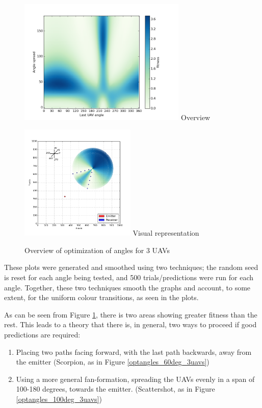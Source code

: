 \documentclass[10pt,a4paper]{book}
\begin{document}
\begin{figure}[H]
\centering
\begin{minipage}{70mm}
  \centering
  \includegraphics[width=80mm]{optangles/3uavs5stepsoverview.png}
  Overview
\end{minipage}%
\begin{minipage}{55mm}
  \centering
  \includegraphics[width=55mm]{optangles/3uavs5steps60deg_2.png}
  Visual representation
\end{minipage}
\caption{Overview of optimization of angles for  3 \glspl{UAV}}
\label{optangles_overview_3uavs}
\end{figure}

These plots were generated and smoothed using two techniques; the random seed is reset for each angle being tested, and 500 trials/predictions were run for each angle. Together, these two techniques smooth the graphs and account, to some extent, for the uniform colour transitions, as seen in the plots. 

As can be seen from Figure \ref{optangles_overview_3uavs}, there is two areas showing greater fitness than the rest. This leads to a theory that there is, in general, two ways to proceed if good predictions are required:

\begin{enumerate}
\item Placing two paths facing forward, with the last path backwards, away from the emitter (Scorpion, as in Figure \ref{optangles_60deg_3uavs})
\item Using a more general fan-formation, spreading the \glspl{UAV} evenly in a span of 100-180 degrees, towards the emitter. (Scattershot, as in Figure \ref{optangles_100deg_3uavs})
\end{enumerate}
\end{document}
